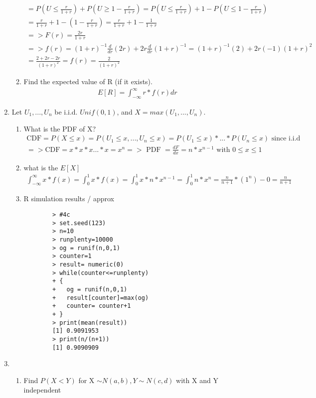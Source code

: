 \documentclass[11pt]{article}
\begin{document}
\begin{enumerate}
\begin{enumerate}
\begin{gather}
		= P(U\le \frac{r}{1+r}) + P(U \ge 1 - \frac{r}{1+r} ) =  P(U\le \frac{r}{1+r}) + 1 - P(U \le 1 - \frac{r}{1+r} ) \\
		 = \frac{r}{1+r} + 1 - (1-\frac{r}{1+r}) = \frac{r}{1+r} + 1 - \frac{1}{1+r} \\
		 => F(r) = \frac{2r}{1+r} \\
		 => f(r) = (1+r)^{-1} \frac{d}{dr}(2r)+ 2r\frac{d}{dr}(1+r)^{-1}=(1+r)^{-1}(2)+ 2r(-1)(1+r)^{2} \\
		 = \frac{2+2r - 2r}{(1+r)^{2}} = f(r) = \frac{2}{(1+r)^{2}}
	\end{gather}
	\item Find the expected value of R (if it exists).
	\begin{gather}
		E[R] = \int_{-\infty}^{\infty}r*f(r)dr
	\end{gather}
\end{enumerate}
\item Let $U_1,...,U_n$ be i.i.d. $Unif(0,1)$, and $X = max(U_1,...,U_n)$.
\begin{enumerate}
	\item What is the PDF of X?
	\begin{gather}
		\text{CDF} = P(X \le x) = P(U_1 \le x , ... , U_n \le x) = P(U_1 \le x) *  ... * P(U_n \le x) \text{ since i.i.d}\\
		=> \text{CDF} = x*x*x...*x = x^n => \text{ PDF } = \frac{dF}{dx} = n*x^{n-1} \text{ with } 0 \le x \le 1
	\end{gather}
	\item what is the $E[X]$
	\begin{gather}
		\int_{-\infty}^{\infty}x*f(x) = \int_{0}^{1}x*f(x) = \int_{0}^{1}x*n*x^{n-1} = \int_{0}^{1}n*x^{n} =\frac{n}{n+1}*(1^n) - 0 = \frac{n}{n+1}
	\end{gather}
	\item R simulation results / approx
	\begin{verbatim}
		> #4c
		> set.seed(123)
		> n=10
		> runplenty=10000
		> og = runif(n,0,1)
		> counter=1
		> result= numeric(0)
		> while(counter<=runplenty)
		+ {
		+   og = runif(n,0,1)
		+   result[counter]=max(og)
		+   counter= counter+1
		+ }
		> print(mean(result))
		[1] 0.9091953
		> print(n/(n+1))
		[1] 0.9090909
	\end{verbatim}
\end{enumerate}
\item 
\begin{enumerate}
	\item Find $P(X < Y)$ for X $\sim N(a, b), Y \sim N(c, d)$ with X and Y independent

\end{enumerate}
\end{enumerate}
\end{document}
